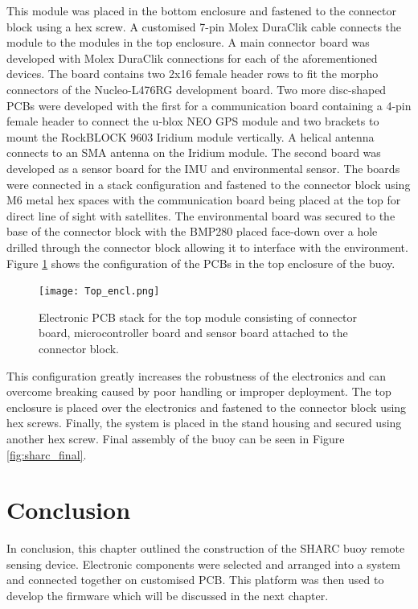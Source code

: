This module was placed in the bottom enclosure and fastened to the connector block using a hex screw. A customised 7-pin Molex DuraClik cable connects the module to the modules in the top enclosure. A main connector board was developed with Molex DuraClik connections for each of the aforementioned devices. The board contains two 2x16 female header rows to fit the morpho connectors of the Nucleo-L476RG development board. Two more disc-shaped PCBs were developed with the first for a communication board containing a 4-pin female header to connect the u-blox NEO GPS module and two brackets to mount the RockBLOCK 9603 Iridium module vertically. A helical antenna connects to an SMA antenna on the Iridium module. The second board was developed as a sensor board for the IMU and environmental sensor. The boards were connected in a stack configuration and fastened to the connector block using M6 metal hex spaces with the communication board being placed at the top for direct line of sight with satellites. The environmental board was secured to the base of the connector block with the BMP280 placed face-down over a hole drilled through the connector block allowing it to interface with the environment. Figure \ref{fig:top_elec} shows the configuration of the PCBs in the top enclosure of the buoy.
\begin{figure}[H]
	\centering
	\texttt{[image: Top\_encl.png]}
	\caption{Electronic PCB stack for the top module consisting of connector board, microcontroller board and sensor board attached to the connector block. }
	\label{fig:top_elec}
\end{figure}

This configuration greatly increases the robustness of the electronics and can overcome breaking caused by poor handling or improper deployment.  The top enclosure is placed over the electronics and fastened to the connector block using hex screws. Finally, the system is placed in the stand housing and secured using another hex screw. Final assembly of the buoy can be seen in Figure \ref{fig:sharc_final}.

\section{Conclusion}

In conclusion, this chapter outlined the construction of the SHARC buoy remote sensing device. Electronic components were selected and arranged into a system and connected together on customised PCB. This platform was then used to develop the firmware which will be discussed in the next chapter.

